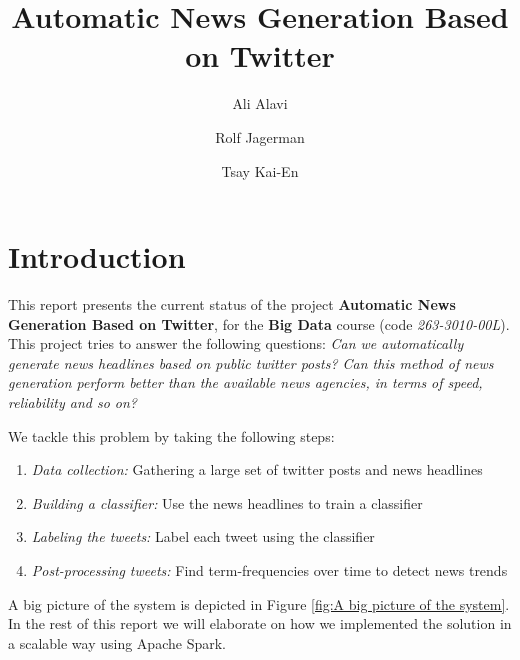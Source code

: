 \documentclass{llncs}
\begin{document}
%
\mainmatter              %
\pagestyle{headings}

%
\title{Automatic News Generation Based on Twitter}
%
%
\author{Ali Alavi \and Rolf Jagerman \and
Tsay Kai-En}
%
%
%

\maketitle              %
%

\section{Introduction}
This report presents the current status of the project \textbf{Automatic News Generation Based on Twitter}, for the \textbf{Big Data} course (code \textit{263-3010-00L}). This project tries to answer the following questions: 
\textit{Can we automatically generate news headlines based on public twitter posts? Can this method of news generation perform better than the available news agencies, in terms of speed, reliability and so on?}

We tackle this problem by taking the following steps:

\begin{enumerate}
	\item \textit{Data collection: }Gathering a large set of twitter posts and news headlines 
	\item \textit{Building a classifier: }Use the news headlines to train a classifier
	\item \textit{Labeling the tweets: }Label each tweet using the classifier
	\item \textit{Post-processing tweets: }Find term-frequencies over time to detect news trends
\end{enumerate}

A big picture of the system is depicted in Figure \ref{fig:A big picture of the system}. In the rest of this report we will elaborate on how we implemented the solution in a scalable way using Apache Spark.
\end{document}

